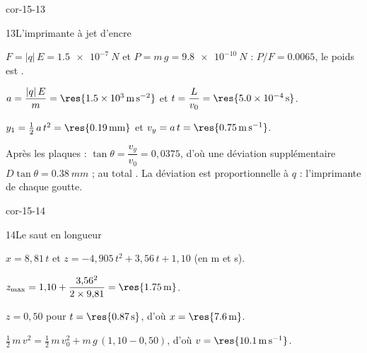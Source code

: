 \begin{blocLivre}{cor-15-13}
\begin{corrige}{13}{L'imprimante à jet d'encre}
\begin{questions}
\item $F=|q|\,E=\qty{1,5e-7}{N}$ et $P=m\,g=\qty{9,8e-10}{N}$ : $P/F=\num{0.0065}$, le poids est .
\item $a=\dfrac{|q|\,E}{m}=\res{\qty{1,5e3}{m.s^{-2}}}$ et $t=\dfrac{L}{v_0}=\res{\qty{5,0e-4}{s}}$.
\item $y_1=\frac12\,a\,t^2=\res{\qty{0,19}{mm}}$ et $v_y=a\,t=\res{\qty{0,75}{m.s^{-1}}}$.
\item Après les plaques : $\tan\theta=\dfrac{v_y}{v_0}=0{,}0375$, d'où une déviation supplémentaire $D\tan\theta=\qty{0,38}{mm}$ ;
au total . La déviation est proportionnelle à $q$ : l'imprimante  de chaque
goutte.
\end{questions}
\end{corrige}
\end{blocLivre}
\begin{blocLivre}{cor-15-14}
\begin{corrige}{14}{Le saut en longueur}
\begin{questions}
\item $x=8{,}81\,t$ et $z=-4{,}905\,t^2+3{,}56\,t+1{,}10$ (en m et s).
\item $z_{\max}=1{,}10+\dfrac{3{,}56^2}{2\times9{,}81}=\res{\qty{1,75}{m}}$.
\item $z=0{,}50$ pour $t=\res{\qty{0,87}{s}}$, d'où $x=\res{\qty{7,6}{m}}$.
\item $\frac12\,m\,v^2=\frac12\,m\,v_0^2+m\,g\,(1{,}10-0{,}50)$, d'où $v=\res{\qty{10,1}{m.s^{-1}}}$.
\end{questions}
\end{corrige}
\end{blocLivre}
